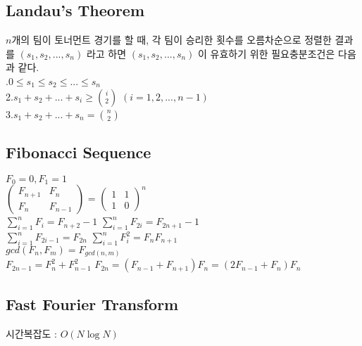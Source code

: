 \documentclass[10pt,landscape,a4paper,twocolumn]{article}
\begin{document}
\subsection{Landau's Theorem}
$n$개의 팀이 토너먼트 경기를 할 때, 각 팀이 승리한 횟수를 오름차순으로 정렬한 결과를 $(s_1,s_2, ... , s_n)$ 라고 하면 $(s_1,s_2, ... , s_n)$ 이 유효하기 위한 필요충분조건은 다음과 같다.\\
.\hspace{1em}$0 \le s_1 \le s_2 \le ... \le s_n$\\
2.\hspace{1em}$s_1+s_2+ ...+s_i \ge {i \choose 2}$ \hspace{1em}$(i=1,2,...,n-1)$\\
3.\hspace{1em}$s_1+s_2+ ...+s_n = {n \choose 2}$\\

\subsection{Fibonacci Sequence}
$F_0=0, F_1=1$\\

$
\begin{pmatrix}
    F_{n+1} & F_n \\
    F_n & F_{n-1}
\end{pmatrix}
$
=
$
\begin{pmatrix}
    1 & 1 \\
    1 & 0
\end{pmatrix}^n
$\\


$\sum_{i=1}^n F_i=F_{n+2}-1$
\hspace{10em}
$\sum_{i=1}^n F_{2i}=F_{2n+1}-1$\\

$\sum_{i=1}^n F_{2i-1}=F_{2n}$
\hspace{11em}
$\sum_{i=1}^n F_i^2=F_nF_{n+1}$\\

$gcd(F_n,F_m)=F_{gcd(n,m)}$\\

$F_{2n-1}=F_n^2+F_{n-1}^2$
\hspace{10em}
$F_{2n}=(F_{n-1}+F_{n+1})F_n=(2F_{n-1}+F_n)F_n$\\

\subsection{Fast Fourier Transform}
시간복잡도 : $O(N\log{N})$

\end{document}
